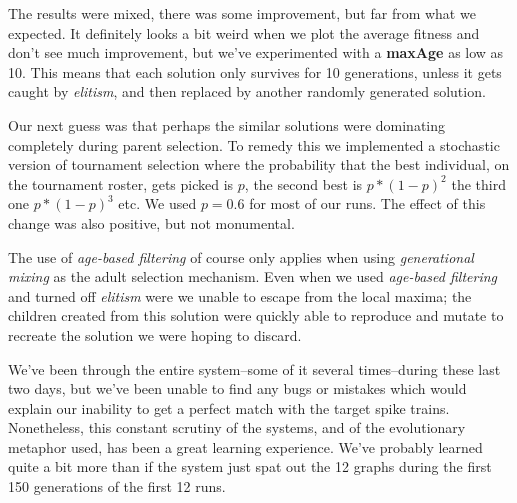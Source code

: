 \documentclass[a4paper]{article}
\begin{document}
The results were mixed, there was some improvement, but far from what we expected. It definitely looks a bit weird when we plot the average fitness and don't see much improvement, but we've experimented with a \textbf{maxAge} as low as 10. This means that each solution only survives for 10 generations, unless it gets caught by \textit{elitism}, and then replaced by another randomly generated solution.

Our next guess was that perhaps the similar solutions were dominating completely during parent selection. To remedy this we implemented a stochastic version of tournament selection where the probability that the best individual, on the tournament roster, gets picked is $p$, the second best is $p*(1-p)^2$ the third one $p*(1-p)^3$ etc. We used $p = 0.6$ for most of our runs. The effect of this change was also positive, but not monumental.

The use of \textit{age-based filtering} of course only applies when using \textit{generational mixing} as the adult selection mechanism. Even when we used \textit{age-based filtering} and turned off \textit{elitism} were we unable to escape from the local maxima; the children created from this solution were quickly able to reproduce and mutate to recreate the solution we were hoping to discard.

We've been through the entire system--some of it several times--during these last two days, but we've been unable to find any bugs or mistakes which would explain our inability to get a perfect match with the target spike trains. Nonetheless, this constant scrutiny of the systems, and of the evolutionary metaphor used, has been a great learning experience. We've probably learned quite a bit more than if the system just spat out the 12 graphs during the first 150 generations of the first 12 runs.
\end{document}
